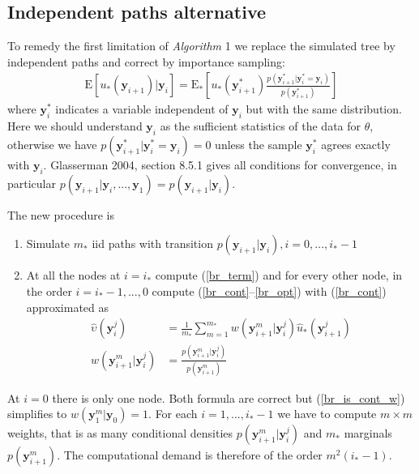 \documentclass[11pt]{article}
\begin{document}
\subsection{Independent paths alternative}
To remedy the first limitation of \textit{Algorithm} 1 we replace the simulated tree by independent paths and correct by importance sampling:
\begin{align}
\mathrm{E}[u_*(\mathbf{y}_{i+1})|\mathbf{y}_i]=\mathrm{E}_*[u_*(\mathbf{y}_{i+1}^*)\frac{p(\mathbf{y}_{i+1}^*|\mathbf{y}_i^*=\mathbf{y}_i)}{p(\mathbf{y}_{i+1}^*)}]
\end{align} where $\mathbf{y}_i^*$ indicates a variable independent of $\mathbf{y}_i$ but with the same distribution. Here we should understand $\mathbf{y}_i$ as the sufficient statistics of the data for $\theta$, otherwise we have $p(\mathbf{y}_{i+1}^*|\mathbf{y}_{i}^*=\mathbf{y}_i)=0$ unless the sample $\mathbf{y}_{i}^*$ agrees exactly with $\mathbf{y}_i$. Glasserman 2004, section 8.5.1 gives all conditions for convergence, in particular $p(\mathbf{y}_{i+1}|\mathbf{y}_i,...,\mathbf{y}_1)=p(\mathbf{y}_{i+1}|\mathbf{y}_i)$.

The new procedure is
\theoremstyle{remark}
\begin{algorithm}[BR]\label{alg:BR}
\hfill\par
\begin{enumerate}
\item Simulate $m_*$ iid paths with transition $p(\mathbf{y}_{i+1}|\mathbf{y}_i), i=0,...,i_*-1$\\
\item At all the nodes at $i=i_*$ compute (\ref{br_term}) and for every other node, in the order $i=i_*-1,...,0$ compute (\ref{br_cont}--\ref{br_opt}) with (\ref{br_cont}) approximated as 
\begin{align}\label{br_is_cont_approx}
\hat \upsilon(\mathbf{y}_i^{j})&=\frac{1}{m_*}\sum_{m=1}^{m_*} w(\mathbf{y}_{i+1}^m|\mathbf{y}_i^j)\hat u_*(\mathbf{y}_{i+1}^{j})\\\label{br_is_cont_w}
w(\mathbf{y}_{i+1}^m|\mathbf{y}_i^j)&=\frac{p(\mathbf{y}_{i+1}^m|\mathbf{y}_{i}^j)}{p(\mathbf{y}_{i+1}^m)}
\end{align}
\end{enumerate}
\end{algorithm}At $i=0$ there is only one node. Both formula are correct but (\ref{br_is_cont_w}) simplifies to  $w(\mathbf{y}_{1}^m|\mathbf{y}_0)=1$. For each $i=1,...,i_*-1$ we have to compute 
$m\times m$ weights, that is as many conditional densities $p(\mathbf{y}_{i+1}^m|\mathbf{y}_{i}^j)$ and $m_*$ marginals $p(\mathbf{y}_{i+1}^m)$. The computational demand is therefore of the order $m^2(i_*-1)$.
\end{document}
